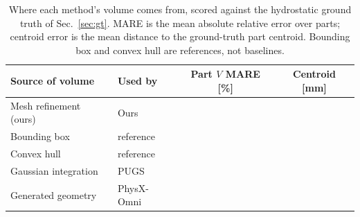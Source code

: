 \begin{table}[t]
\caption{Where each method's volume comes from, scored against the hydrostatic
ground truth of Sec.~\ref{sec:gt}. MARE is the mean absolute relative error over
parts; centroid error is the mean distance to the ground-truth part centroid.
Bounding box and convex hull are references, not baselines.}
\label{tab:volume}
\centering
\scriptsize
\setlength{\tabcolsep}{4pt}
\begin{tabular}{llcc}
\hline
Source of volume & Used by & Part $V$ MARE [\%] & Centroid [mm] \\
\hline
Mesh refinement (ours)  & Ours        & \rev{--} & \rev{--} \\
Bounding box            & reference   & \rev{--} & \rev{--} \\
Convex hull             & reference   & \rev{--} & \rev{--} \\
Gaussian integration    & PUGS        & \rev{--} & \rev{--} \\
Generated geometry      & PhysX-Omni  & \rev{--} & \rev{--} \\
\hline
\end{tabular}
\end{table}